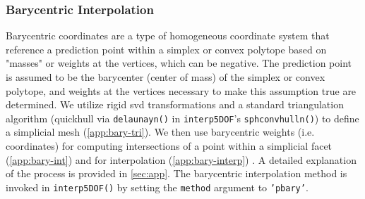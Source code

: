 \documentclass[final,twocolumn,12pt]{elsarticle}
\newcommand{\outpt}{prediction}
\begin{document}
\subsubsection{Barycentric Interpolation}
\label{sec:methods:interp:bary}



Barycentric coordinates are a type of homogeneous coordinate system that reference a \outpt{} point within a simplex \cite{langerSphericalBarycentricCoordinates2006} or convex polytope \cite{floaterGeneralizedBarycentricCoordinates2015,meyerGeneralizedBarycentricCoordinates2002,langerSphericalBarycentricCoordinates2006} based on "masses" or weights at the vertices, which can be negative. The \outpt{} point is assumed to be the barycenter (center of mass) of the simplex or convex polytope, and weights at the vertices necessary to make this assumption true are determined. We utilize rigid \gls{svd} transformations and a standard triangulation algorithm (quickhull \cite{barberQuickhullAlgorithmConvex1996} via \texttt{delaunayn()} in \texttt{interp5DOF}'s \texttt{sphconvhulln()}) to define a simplicial mesh (\cref{app:bary-tri}). We then use barycentric weights (i.e. coordinates) for computing intersections of a point within a simplicial facet (\cref{app:bary-int}) and for interpolation (\cref{app:bary-interp}) \cite{langerSphericalBarycentricCoordinates2006}. A detailed explanation of the process is provided in \cref{sec:app}. The barycentric interpolation method is invoked in \texttt{interp5DOF()} by setting the \texttt{method} argument to \texttt{'pbary'}.

\subsubsection{}
\label{sec:methods:interp:gpr}
\end{document}
